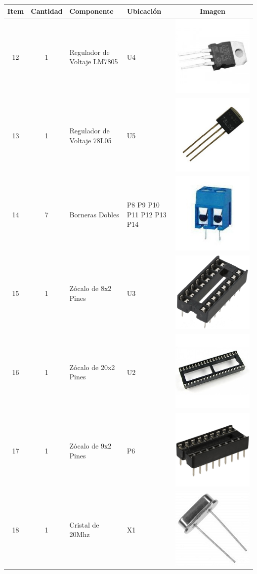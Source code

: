 \begin{tabular}{|c|c|l|p{5cm}|c|}	
	\hline
	\textbf{Item} & \textbf{Cantidad} & \textbf{Componente}                        & \textbf{Ubicación}                           & \textbf{Imagen}                                                                     \\[0.5cm] \hline\hline
	12   & 1        & Regulador de Voltaje LM7805       & U4                                  & \includegraphics[width=0.05\linewidth]{Componentes/lm7805}                 \\[0.5cm] \hline
	13   & 1        & Regulador de Voltaje 78L05        & U5                                  & \includegraphics[width=0.05\linewidth]{Componentes/78L05}                  \\[0.5cm] \hline
	14   & 7        & Borneras Dobles                   & P8 P9 P10 P11 P12 P13 P14           & \includegraphics[width=0.05\linewidth]{Componentes/bornera}                \\[0.5cm] \hline
	15   & 1        & Zócalo de 8x2 Pines               & U3                                  & \includegraphics[width=0.05\linewidth]{Componentes/zocalo-8}               \\[0.5cm] \hline
	16   & 1        & Zócalo de 20x2 Pines              & U2                                  & \includegraphics[width=0.05\linewidth]{Componentes/zocalo-20}              \\[0.5cm] \hline
	17   & 1        & Zócalo de 9x2 Pines               & P6                                  & \includegraphics[width=0.05\linewidth]{Componentes/zocalo-9}               \\[0.5cm] \hline
	18   & 1        & Cristal de 20Mhz                  & X1                                  & \includegraphics[width=0.05\linewidth]{Componentes/cristal-20mhz}          \\[0.5cm] \hline

\end{tabular}
